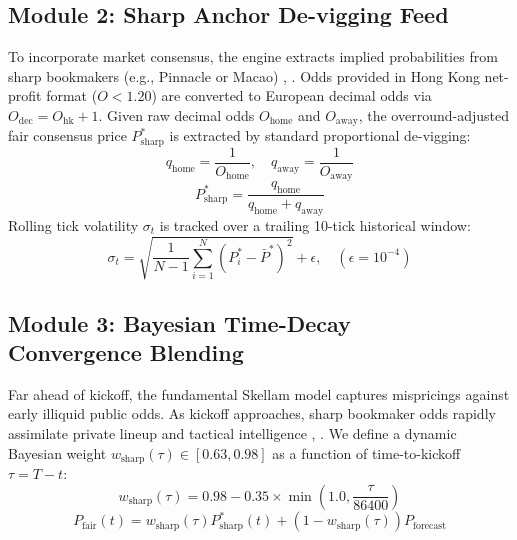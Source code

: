 \documentclass[10pt,twocolumn]{article}
\begin{document}
\subsection{Module 2: Sharp Anchor De-vigging Feed}

To incorporate market consensus, the engine extracts implied probabilities from sharp bookmakers (e.g., Pinnacle or Macao) \cite{6}, \cite{16}. Odds provided in Hong Kong net-profit format ($O < 1.20$) are converted to European decimal odds via $O_{\text{dec}} = O_{\text{hk}} + 1$. Given raw decimal odds $O_{\text{home}}$ and $O_{\text{away}}$, the overround-adjusted fair consensus price $P^*_{\text{sharp}}$ is extracted by standard proportional de-vigging:
\begin{equation}
q_{\text{home}} = \frac{1}{O_{\text{home}}}, \quad q_{\text{away}} = \frac{1}{O_{\text{away}}}
\end{equation}
\begin{equation}
P^*_{\text{sharp}} = \frac{q_{\text{home}}}{q_{\text{home}} + q_{\text{away}}}
\end{equation}
Rolling tick volatility $\sigma_t$ is tracked over a trailing 10-tick historical window:
\begin{equation}
\sigma_t = \sqrt{\frac{1}{N-1} \sum_{i=1}^N (P^*_i - \bar{P}^*)^2} + \epsilon, \quad (\epsilon = 10^{-4})
\end{equation}

\subsection[Module 3: Bayesian Time-Decay Convergence Blending]{Module 3: Bayesian Time-Decay \\ Convergence Blending}

Far ahead of kickoff, the fundamental Skellam model captures mispricings against early illiquid public odds. As kickoff approaches, sharp bookmaker odds rapidly assimilate private lineup and tactical intelligence \cite{6}, \cite{10}. We define a dynamic Bayesian weight $w_{\text{sharp}}(\tau) \in [0.63, 0.98]$ as a function of time-to-kickoff $\tau = T - t$:
\begin{equation}
w_{\text{sharp}}(\tau) = 0.98 - 0.35 \times \min\left(1.0, \frac{\tau}{86400}\right)
\end{equation}
\begin{equation}
P_{\text{fair}}(t) = w_{\text{sharp}}(\tau) P^*_{\text{sharp}}(t) + \left(1 - w_{\text{sharp}}(\tau)\right) P_{\text{forecast}}
\end{equation}
\end{document}
